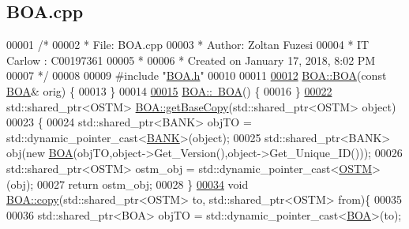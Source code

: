 \hypertarget{_b_o_a_8cpp_source}{}\subsection{B\+O\+A.\+cpp}

\begin{DoxyCode}
00001 \textcolor{comment}{/* }
00002 \textcolor{comment}{ * File:   BOA.cpp}
00003 \textcolor{comment}{ * Author: Zoltan Fuzesi}
00004 \textcolor{comment}{ * IT Carlow : C00197361}
00005 \textcolor{comment}{ *}
00006 \textcolor{comment}{ * Created on January 17, 2018, 8:02 PM}
00007 \textcolor{comment}{ */}
00008 
00009 \textcolor{preprocessor}{#include "\hyperlink{_b_o_a_8h}{BOA.h}"}
00010 
00011 
\hypertarget{_b_o_a_8cpp_source.tex_l00012}{}\hyperlink{class_b_o_a_a99ebf22a8d824761dc82e7e191e6f173_a99ebf22a8d824761dc82e7e191e6f173}{00012} \hyperlink{class_b_o_a_ad42dc670d422172c9bcf9b3d354c8a3c_ad42dc670d422172c9bcf9b3d354c8a3c}{BOA::BOA}(\textcolor{keyword}{const} \hyperlink{class_b_o_a}{BOA}& orig) \{
00013 \}
00014 
\hypertarget{_b_o_a_8cpp_source.tex_l00015}{}\hyperlink{class_b_o_a_abe27b17a23ceffc6269dbe6d81de5212_abe27b17a23ceffc6269dbe6d81de5212}{00015} \hyperlink{class_b_o_a_abe27b17a23ceffc6269dbe6d81de5212_abe27b17a23ceffc6269dbe6d81de5212}{BOA::~BOA}() \{
00016 \}
\hypertarget{_b_o_a_8cpp_source.tex_l00022}{}\hyperlink{class_b_o_a_a46ace5d3c945a423e93912673cadfad5_a46ace5d3c945a423e93912673cadfad5}{00022} std::shared\_ptr<OSTM> \hyperlink{class_b_o_a_a46ace5d3c945a423e93912673cadfad5_a46ace5d3c945a423e93912673cadfad5}{BOA::getBaseCopy}(std::shared\_ptr<OSTM> \textcolor{keywordtype}{object})
00023 \{
00024         std::shared\_ptr<BANK> objTO = std::dynamic\_pointer\_cast<\hyperlink{class_b_a_n_k}{BANK}>(object);
00025     std::shared\_ptr<BANK> obj(\textcolor{keyword}{new} \hyperlink{class_b_o_a_ad42dc670d422172c9bcf9b3d354c8a3c_ad42dc670d422172c9bcf9b3d354c8a3c}{BOA}(objTO,object->Get\_Version(),\textcolor{keywordtype}{object}->Get\_Unique\_ID())); 
00026         std::shared\_ptr<OSTM> ostm\_obj = std::dynamic\_pointer\_cast<\hyperlink{class_o_s_t_m}{OSTM}>(obj);
00027     \textcolor{keywordflow}{return} ostm\_obj;
00028 \}
\hypertarget{_b_o_a_8cpp_source.tex_l00034}{}\hyperlink{class_b_o_a_a54fbcabb55b22fb72f45986768974403_a54fbcabb55b22fb72f45986768974403}{00034} \textcolor{keywordtype}{void} \hyperlink{class_b_o_a_a54fbcabb55b22fb72f45986768974403_a54fbcabb55b22fb72f45986768974403}{BOA::copy}(std::shared\_ptr<OSTM> to, std::shared\_ptr<OSTM> from)\{
00035 
00036     std::shared\_ptr<BOA> objTO = std::dynamic\_pointer\_cast<\hyperlink{class_b_o_a}{BOA}>(to);

\end{DoxyCode}
